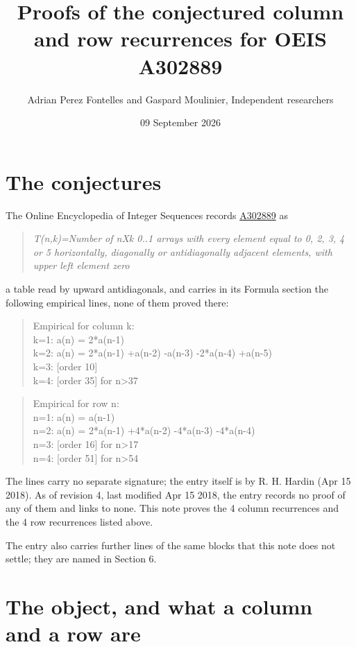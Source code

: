 \documentclass[11pt]{article}
\title{Proofs of the conjectured column and row recurrences for OEIS A302889}
\author{Adrian Perez Fontelles and Gaspard Moulinier, Independent researchers}
\date{09 September 2026}
\theoremstyle{definition}
\begin{document}
\maketitle
\section{The conjectures}

The Online Encyclopedia of Integer Sequences records \href{https://oeis.org/A302889}{A302889} as

\begin{quote}\itshape T(n,k)=Number of nXk 0..1 arrays with every element equal to 0, 2, 3, 4 or 5 horizontally, diagonally or antidiagonally adjacent elements, with upper left element zero\end{quote}

a table read by upward antidiagonals, and carries in its Formula section the following empirical lines, none of them proved there:

\begin{quote}\ttfamily Empirical for column k:\\
k=1: a(n) = 2*a(n-1)\\k=2: a(n) = 2*a(n-1) +a(n-2) -a(n-3) -2*a(n-4) +a(n-5)\\k=3: [order 10]\\k=4: [order 35] for n>37\end{quote}

\begin{quote}\ttfamily Empirical for row n:\\
n=1: a(n) = a(n-1)\\n=2: a(n) = 2*a(n-1) +4*a(n-2) -4*a(n-3) -4*a(n-4)\\n=3: [order 16] for n>17\\n=4: [order 51] for n>54\end{quote}

The lines carry no separate signature; the entry itself is by R. H. Hardin (Apr 15 2018). As of revision 4, last modified Apr 15 2018, the entry records no proof of any of them and links to none. This note proves the 4 column recurrences and the 4 row recurrences listed above.

The entry also carries further lines of the same blocks that this note does not settle; they are named in Section 6.

\section{The object, and what a column and a row are}
\end{document}
